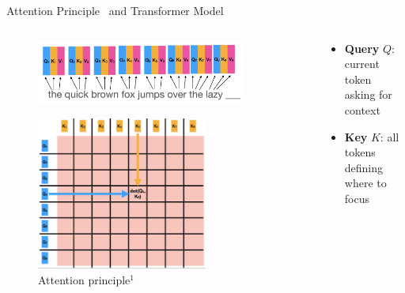 \documentclass[11pt,aspectratio=169]{beamer}
\begin{document}
\begin{frame}{Attention Principle~\cite{Bahdanau2014NeuralMT} and Transformer Model~\cite{DBLP:journals/corr/VaswaniSPUJGKP17}}
    \begin{columns}
        \renewcommand{\thempfootnote}{}
        \begin{column}{0.45\linewidth}
            \vspace{-0.3cm}
            \begin{figure}
                \centering
                \includegraphics[width=0.85\textwidth]{attention_1.png}
            \end{figure}
            \vspace{-0.4cm}
            \begin{figure}
                \centering
                \includegraphics[width=0.7\textwidth]{attention_2.png}
                \caption{\centering Attention principle$^1$}
            \end{figure}
        \end{column}
        \begin{column}{0.55\linewidth}
            \begin{itemize}
                \item \textbf{Query} $Q$: current token asking for context
                \item \textbf{Key} $K$: all tokens defining where to focus

\end{itemize}
\end{column}
\end{columns}
\end{frame}
\end{document}
